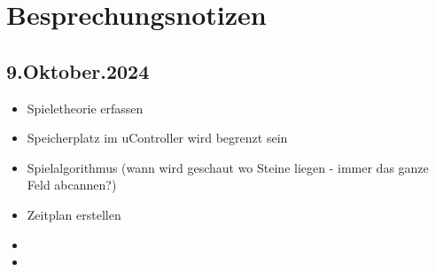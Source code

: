 \chapter*{Besprechungsnotizen}

\section{9.Oktober.2024}

\begin{itemize}
	\item Spieletheorie erfassen
	\item Speicherplatz im uController wird begrenzt sein
	\item Spielalgorithmus (wann wird geschaut wo Steine liegen - immer das ganze Feld abcannen?)
	\item Zeitplan erstellen
	\item 
	\item 
\end{itemize}
